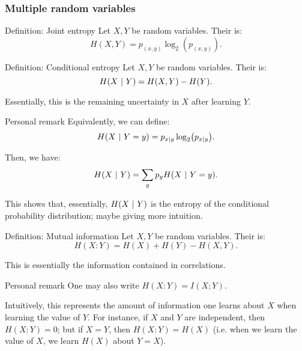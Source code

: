 \documentclass[a4paper]{article}
\begin{document}
\subsubsection{Multiple random variables}

\begin{parag}{Definition: Joint entropy}
    Let $X, Y$ be random variables. Their  is: 
    \[H\left(X, Y\right) = p_{\left(x, y\right)} \log_{2}\left(p_{\left(x, y\right)}\right).\]
\end{parag}

\begin{parag}{Definition: Conditional entropy}
    Let $X, Y$ be random variables. Their  is: 
    \[H\left(X \suchthat Y\right) = H\left(X, Y\right) - H\left(Y\right).\]

    Essentially, this is the remaining uncertainty in $X$ after learning $Y$.

    \begin{subparag}{Personal remark}
        Equivalently, we can define: 
        \[H\left(X \suchthat Y = y\right) = p_{x | y} \log_{2}\left(p_{x|y }\right).\]
        
        Then, we have: 
        \[H\left(X \suchthat Y\right) = \sum_{y} p_y H\left(X \suchthat Y = y\right).\]

        This shows that, essentially, $H\left(X \suchthat Y\right)$ is the entropy of the conditional probability distribution; maybe giving more intuition.
    \end{subparag}
\end{parag}

\begin{parag}{Definition: Mutual information}
    Let $X, Y$ be random variables. Their  is: 
    \[H\left(X : Y\right) = H\left(X\right) + H\left(Y\right) - H\left(X, Y\right).\]

    This is essentially the information contained in correlations.

    \begin{subparag}{Personal remark}
        One may also write $H\left(X: Y\right) = I\left(X; Y\right)$.

        Intuitively, this represents the amount of information one learns about $X$ when learning the value of $Y$. For instance, if $X$ and $Y$ are independent, then $H\left(X: Y\right) = 0$; but if $X = Y$, then $H\left(X: Y\right) = H\left(X\right)$ (i.e. when we learn the value of $X$, we learn $H\left(X\right)$ about $Y = X$).
    \end{subparag}
\end{parag}
\end{document}
